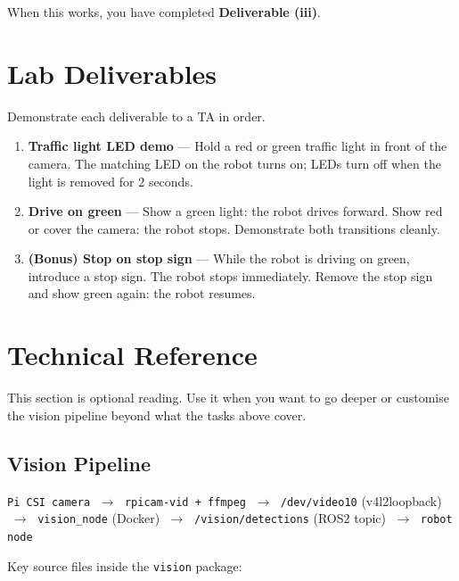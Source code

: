 \documentclass{ol-softwaremanual}
\begin{document}
\noindent When this works, you have completed \textbf{Deliverable (iii)}.


\section{Lab Deliverables}

Demonstrate each deliverable to a TA in order.

\begin{enumerate}
  \item \textbf{Traffic light LED demo} --- Hold a red or green traffic light in
        front of the camera. The matching LED on the robot turns on; LEDs turn off
        when the light is removed for 2 seconds.
  \item \textbf{Drive on green} --- Show a green light: the robot drives forward.
        Show red or cover the camera: the robot stops. Demonstrate both
        transitions cleanly.
  \item \textbf{(Bonus) Stop on stop sign} --- While the robot is driving on
        green, introduce a stop sign. The robot stops immediately.
        Remove the stop sign and show green again: the robot resumes.
\end{enumerate}


\section{Technical Reference}

This section is optional reading. Use it when you want to go deeper or customise
the vision pipeline beyond what the tasks above cover.

\subsection{Vision Pipeline}

\begin{center}
\texttt{Pi CSI camera}
$\;\to\;$ \texttt{rpicam-vid + ffmpeg}
$\;\to\;$ \texttt{/dev/video10} (v4l2loopback)
$\;\to\;$ \texttt{vision\_node} (Docker)
$\;\to\;$ \texttt{/vision/detections} (ROS2 topic)
$\;\to\;$ \texttt{robot node}
\end{center}

Key source files inside the \texttt{vision} package:
\end{document}
